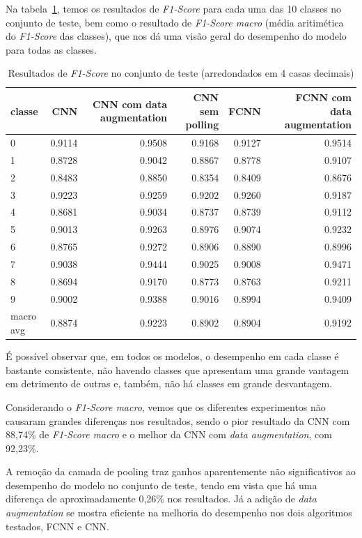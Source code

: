 \documentclass[12pt]{article}
\begin{document}
Na tabela~\ref{table:results_f1}, temos os resultados de \textit{F1-Score} para cada uma das 10 classes no conjunto de teste, bem como o resultado de \textit{F1-Score macro} (média aritimética do \textit{F1-Score} das classes), que nos dá uma visão geral do desempenho do modelo para todas as classes.

\begin{table}[H]\scriptsize\centering
\begin{tabular}{l|rrrrr}
\toprule
classe & CNN & CNN com data augmentation & CNN sem polling & FCNN & FCNN com data augmentation \\
\midrule
0 & 0.9114 & 0.9508 & 0.9168 & 0.9127 & 0.9514 \\
1 & 0.8728 & 0.9042 & 0.8867 & 0.8778 & 0.9107 \\
2 & 0.8483 & 0.8850 & 0.8354 & 0.8409 & 0.8676 \\
3 & 0.9223 & 0.9259 & 0.9202 & 0.9260 & 0.9187 \\
4 & 0.8681 & 0.9034 & 0.8737 & 0.8739 & 0.9112 \\
5 & 0.9013 & 0.9263 & 0.8976 & 0.9074 & 0.9232 \\
6 & 0.8765 & 0.9272 & 0.8906 & 0.8890 & 0.8996 \\
7 & 0.9038 & 0.9444 & 0.9025 & 0.9008 & 0.9471 \\
8 & 0.8694 & 0.9170 & 0.8773 & 0.8763 & 0.9211 \\
9 & 0.9002 & 0.9388 & 0.9016 & 0.8994 & 0.9409 \\
\midrule
macro avg & 0.8874 & 0.9223 & 0.8902 & 0.8904 & 0.9192 \\
\bottomrule
\end{tabular}

    
\caption{Resultados de \textit{F1-Score} no conjunto de teste (arredondados em 4 casas decimais)}
\label{table:results_f1}
\end{table}

É possível observar que, em todos os modelos, o desempenho em cada classe é bastante consistente, não havendo classes que apresentam uma grande vantagem em detrimento de outras e, também, não há classes em grande desvantagem.

Considerando o \textit{F1-Score macro}, vemos que os diferentes experimentos não causaram grandes diferenças nos resultados, sendo o pior resultado da CNN com 88,74\% de \textit{F1-Score macro} e o melhor da CNN com \textit{data augmentation}, com 92,23\%.

A remoção da camada de pooling traz ganhos aparentemente não significativos ao desempenho do modelo no conjunto de teste, tendo em vista que há uma diferença de aproximadamente 0,26\% nos resultados. Já a adição de \textit{data augmentation} se mostra eficiente na melhoria do desempenho nos dois algoritmos testados, FCNN e CNN.
\end{document}
